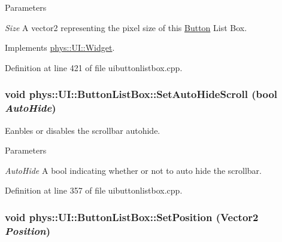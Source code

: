 \begin{DoxyParams}{Parameters}
\item[{\em Size}]A vector2 representing the pixel size of this \hyperlink{classphys_1_1UI_1_1Button}{Button} List Box. \end{DoxyParams}


Implements \hyperlink{classphys_1_1UI_1_1Widget_a8ceb54fd067847844b314dedd8e529f8}{phys::UI::Widget}.



Definition at line 421 of file uibuttonlistbox.cpp.

\hypertarget{classphys_1_1UI_1_1ButtonListBox_ab5caa7d6bd929875bb8ca1278743ff40}{
\subsubsection[{SetAutoHideScroll}]{\setlength{\rightskip}{0pt plus 5cm}void phys::UI::ButtonListBox::SetAutoHideScroll (bool {\em AutoHide})}}
\label{d4/dd7/classphys_1_1UI_1_1ButtonListBox_ab5caa7d6bd929875bb8ca1278743ff40}


Eanbles or disables the scrollbar autohide. 


\begin{DoxyParams}{Parameters}
\item[{\em AutoHide}]A bool indicating whether or not to auto hide the scrollbar. \end{DoxyParams}


Definition at line 357 of file uibuttonlistbox.cpp.

\hypertarget{classphys_1_1UI_1_1ButtonListBox_a9a45fe4192092b76bb879b281c29d431}{
\subsubsection[{SetPosition}]{\setlength{\rightskip}{0pt plus 5cm}void phys::UI::ButtonListBox::SetPosition ({\bf Vector2} {\em Position})}}
\label{d4/dd7/classphys_1_1UI_1_1ButtonListBox_a9a45fe4192092b76bb879b281c29d431}


